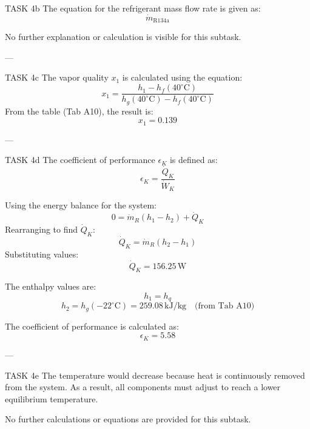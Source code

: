 TASK 4b  
The equation for the refrigerant mass flow rate is given as:  
\[
\dot{m}_{\text{R134a}}
\]  

No further explanation or calculation is visible for this subtask.

---

TASK 4c  
The vapor quality \( x_1 \) is calculated using the equation:  
\[
x_1 = \frac{h_1 - h_f(40^\circ\text{C})}{h_g(40^\circ\text{C}) - h_f(40^\circ\text{C})}
\]  
From the table (Tab A10), the result is:  
\[
x_1 = 0.139
\]  

---

TASK 4d  
The coefficient of performance \( \epsilon_K \) is defined as:  
\[
\epsilon_K = \frac{\dot{Q}_K}{\dot{W}_K}
\]  

Using the energy balance for the system:  
\[
0 = \dot{m}_R (h_1 - h_2) + \dot{Q}_K
\]  
Rearranging to find \( \dot{Q}_K \):  
\[
\dot{Q}_K = \dot{m}_R (h_2 - h_1)
\]  
Substituting values:  
\[
\dot{Q}_K = 156.25 \, \text{W}
\]  

The enthalpy values are:  
\[
h_1 = h_q
\]  
\[
h_2 = h_g(-22^\circ\text{C}) = 259.08 \, \text{kJ/kg} \quad \text{(from Tab A10)}
\]  

The coefficient of performance is calculated as:  
\[
\epsilon_K = 5.58
\]  

---

TASK 4e  
The temperature would decrease because heat is continuously removed from the system. As a result, all components must adjust to reach a lower equilibrium temperature.  

No further calculations or equations are provided for this subtask.